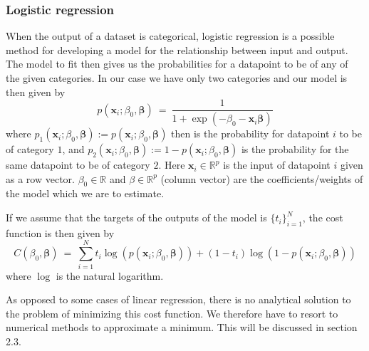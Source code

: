 \documentclass[a4paper,english]{article}
\begin{document}
\subsubsection{Logistic regression}
When the output of a dataset is categorical, logistic
regression is a possible method for developing a model for the 
relationship between input and output. 
The model to fit then gives us the probabilities for a datapoint to be of 
any of the given categories. In our case we have only two categories 
and our model is then given by
\begin{equation}
    p(\bm{x}_i; \beta_0, \bm{\beta}) 
    \ = \ \frac{1}{1 + \exp(- \beta_0 - \bm{x}_i\bm{\beta})}
\end{equation}
where 
$p_1(\bm{x}_i; \beta_0, \bm{\beta}) := p(\bm{x}_i; \beta_0, \bm{\beta})$ 
then is the probability 
for datapoint $i$ to be of category $1$, and 
$p_2(\bm{x}_i; \beta_0, \bm{\beta}) := 1 -p(\bm{x}_i; \beta_0, \bm{\beta})$ 
is the probability for the same datapoint to be of category $2$.
Here $\bm{x}_i \in \mathbb{R}^p$ is the input of datapoint $i$ given
as a row vector. 
$\beta_0 \in \mathbb{R}$ and $\beta \in \mathbb{R}^p$ (column vector) 
are the coefficients/weights of the model which we are to estimate.
\par
If we assume that the targets of the outputs of the model is 
$\{t_i\}_{i=1}^N$, the cost function is then given by 
\begin{equation}
    C(\beta_0, \bm{\beta}) \ = \
    \sum_{i=1}^N t_i \log(p(\bm{x}_i; \beta_0, \bm{\beta})) + 
    (1 - t_i) \log(1- p(\bm{x}_i; \beta_0, \bm{\beta}))
\end{equation}
where $\log$ is the natural logarithm.
\par
As opposed to some cases of linear regression, there is no analytical
solution to the problem of minimizing this cost function. We therefore
have to resort to numerical methods to approximate a minimum. This will
be discussed in section 2.3.
\end{document}
